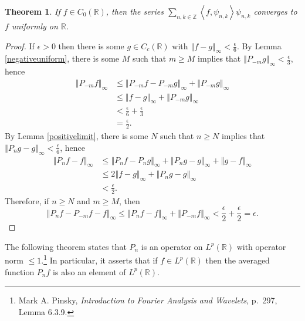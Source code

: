 \documentclass{article}
\newcommand{\inner}[2]{\left\langle #1, #2 \right\rangle}
\newcommand{\norm}[1]{\left\Vert #1 \right\Vert}
\newtheorem{theorem}{Theorem}
\theoremstyle{definition}
\begin{document}
\begin{theorem}
If $f \in C_0(\mathbb{R})$, then the series $\sum_{n,k \in \mathbb{Z}} \inner{f}{\psi_{n,k}} \psi_{n,k}$ 
converges to $f$ uniformly on $\mathbb{R}$.
\end{theorem}
\begin{proof}
If $\epsilon>0$ then there is some $g \in C_c(\mathbb{R})$ with $\norm{f-g}_\infty < \frac{\epsilon}{6}$. 
By Lemma \ref{negativeuniform}, there is some $M$ such that $m \geq M$ implies that
$\norm{P_{-m} g}_\infty < \frac{\epsilon}{3}$, hence
\begin{align*}
\norm{P_{-m}f}_\infty &\leq \norm{P_{-m}f-P_{-m}g}_\infty + \norm{P_{-m}g}_\infty\\
&\leq \norm{f-g}_\infty + \norm{P_{-m}g}_\infty\\
&<\frac{\epsilon}{6}+\frac{\epsilon}{3}\\
&=\frac{\epsilon}{2}.
\end{align*}
By Lemma \ref{positivelimit}, there is some $N$ such that $n \geq N$ implies that
$\norm{P_ng-g}_\infty <\frac{\epsilon}{6}$, hence
\begin{align*}
\norm{P_nf-f}_\infty& \leq \norm{P_nf-P_ng}_\infty + \norm{P_ng-g}_\infty + \norm{g-f}_\infty\\
&\leq 2\norm{f-g}_\infty + \norm{P_ng-g}_\infty\\
&<\frac{\epsilon}{2}.
\end{align*}
Therefore, if $n \geq N$ and $m \geq M$, then
\[
\norm{P_nf-P_{-m}f-f}_\infty \leq \norm{P_nf-f}_\infty + \norm{P_{-m}f}_\infty < 
\frac{\epsilon}{2}+\frac{\epsilon}{2}=\epsilon.
\]
\end{proof}


The following theorem states that $P_n$ is an operator on $L^p(\mathbb{R})$ with operator norm $\leq 1$.\footnote{Mark A. Pinsky, {\em Introduction to Fourier Analysis and Wavelets}, p.~297, Lemma 6.3.9.} In particular, it asserts that if $f \in L^p(\mathbb{R})$ then the averaged function $P_n f$ is also an element of $L^p(\mathbb{R})$.
\end{document}
